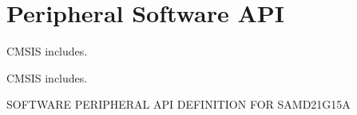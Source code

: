 \hypertarget{group___s_a_m_d21_g15_a__api}{}\section{Peripheral Software A\+PI}
\label{group___s_a_m_d21_g15_a__api}


C\+M\+S\+IS includes.  


C\+M\+S\+IS includes. 

S\+O\+F\+T\+W\+A\+RE P\+E\+R\+I\+P\+H\+E\+R\+AL A\+PI D\+E\+F\+I\+N\+I\+T\+I\+ON F\+OR S\+A\+M\+D21\+G15A 